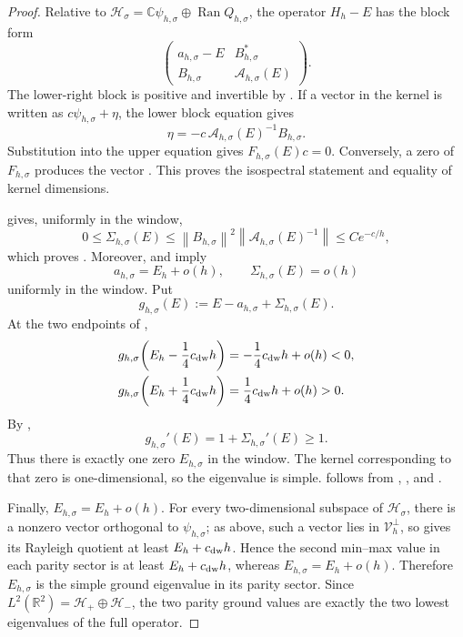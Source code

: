 \documentclass[11pt]{article}
\newcommand{\R}{\mathbb R}
\newcommand{\C}{\mathbb C}
\newcommand{\norm}[1]{\left\|#1\right\|}
\newcommand{\Ran}{\operatorname{Ran}}
\begin{document}
\begin{proof}
Relative to
$\mathcal H_\sigma=\C\psi_{h,\sigma}\oplus\Ran Q_{h,\sigma}$, the operator
$H_h-E$ has the block form
\[
 \begin{pmatrix}
 a_{h,\sigma}-E & B_{h,\sigma}^*\\
 B_{h,\sigma} & \mathcal A_{h,\sigma}(E)
 \end{pmatrix}.
\]
The lower-right block is positive and invertible by
.  If a vector in the kernel is written as
$c\psi_{h,\sigma}+\eta$, the lower block equation gives
\[
 \eta=-c\,\mathcal A_{h,\sigma}(E)^{-1}B_{h,\sigma}.
\]
Substitution into the upper equation gives
$F_{h,\sigma}(E)c=0$.  Conversely, a zero of
$F_{h,\sigma}$ produces the vector .
This proves the isospectral statement and equality of kernel dimensions.

 gives, uniformly in the window,
\[
 0\le\Sigma_{h,\sigma}(E)
 \le \norm{B_{h,\sigma}}^2
 \norm{\mathcal A_{h,\sigma}(E)^{-1}}
 \le Ce^{-c/h},
\]
which proves .  Moreover,  and  imply
\[
 a_{h,\sigma}=E_h+o(h),
 \qquad
 \Sigma_{h,\sigma}(E)=o(h)
\]
uniformly in the window.  Put
\[
 g_{h,\sigma}(E):=E-a_{h,\sigma}+\Sigma_{h,\sigma}(E).
\]
At the two endpoints of ,
\begin{align*}
 g_{h,\sigma}\!\left(E_h-\frac14c_{\rm dw}h\right)
 &=-\frac14c_{\rm dw}h+o(h)<0,\\
 g_{h,\sigma}\!\left(E_h+\frac14c_{\rm dw}h\right)
 &=\frac14c_{\rm dw}h+o(h)>0.
\end{align*}
By ,
\[
g_{h,\sigma}'(E)=1+\Sigma_{h,\sigma}'(E)\ge1.
\]
Thus there is exactly one zero $E_{h,\sigma}$ in the window.  The kernel
corresponding to that zero is one-dimensional, so the eigenvalue is simple.
 follows from
, , and
.

Finally, $E_{h,\sigma}=E_h+o(h)$.  For every two-dimensional subspace of
$\mathcal H_\sigma$, there is a nonzero vector orthogonal to
$\psi_{h,\sigma}$; as above, such a vector lies in $\mathcal V_h^\perp$, so  gives its Rayleigh quotient
at least $E_h+c_{\rm dw}h$.  Hence the second min--max value in each parity
sector is at least $E_h+c_{\rm dw}h$, whereas $E_{h,\sigma}=E_h+o(h)$.
Therefore $E_{h,\sigma}$ is the simple ground eigenvalue in its parity sector.
Since $L^2(\R^2)=\mathcal H_+\oplus\mathcal H_-$, the two parity ground
values are exactly the two lowest eigenvalues of the full operator.


\end{proof}
\end{document}

